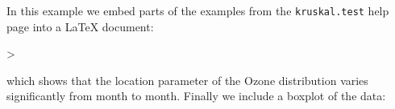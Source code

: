 \documentclass[a4paper]{article}
\title{}
\begin{document}

\maketitle
In this example we embed parts of the examples from the
\texttt{kruskal.test} help page into a \LaTeX{} document:
\begin{Schunk}
\begin{Sinput}
> 
\end{Sinput}
\end{Schunk}
which shows that the location parameter of the Ozone
distribution varies significantly from month to month. Finally we
include a boxplot of the data:
\end{document}
